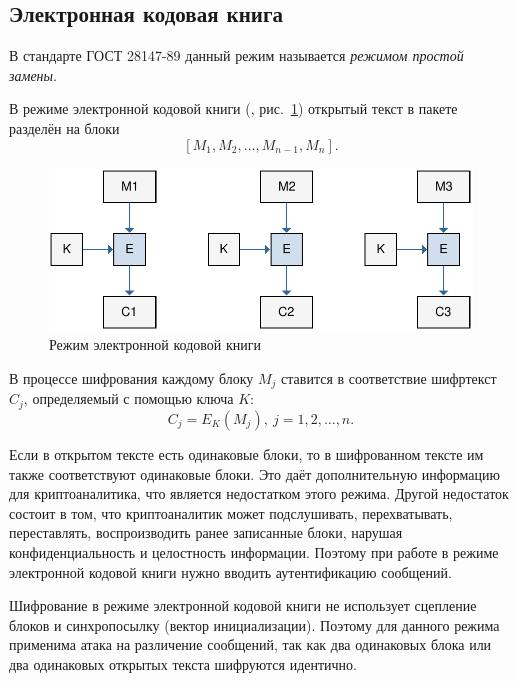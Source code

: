 \subsection{Электронная кодовая книга}

В стандарте ГОСТ 28147-89 данный режим называется \emph{режимом простой замены}.~\cite{GOST-89}

В режиме электронной кодовой книги (, рис.~\ref{fig:ECB}) открытый текст в пакете разделён на блоки
    \[ \left[ M_1, M_2, \dots, M_{n-1}, M_n \right]. \]

\begin{figure}[bt]
	\centering
	\includegraphics[width=1\textwidth]{pic/ECB}
	\caption{Режим электронной кодовой книги}
	\label{fig:ECB}
\end{figure}

В процессе шифрования каждому блоку $M_j$ ставится в соответствие шифртекст $C_j$, определяемый с помощью ключа $K$:
    \[ C_j = E_K(M_j), ~ j = 1, 2, \dots, n. \]

Если в открытом тексте есть одинаковые блоки, то в шифрованном тексте им также соответствуют одинаковые блоки. Это даёт дополнительную информацию для криптоаналитика, что является недостатком этого режима. Другой недостаток состоит в том, что криптоаналитик может подслушивать, перехватывать, переставлять, воспроизводить ранее записанные блоки, нарушая конфиденциальность и целостность информации. Поэтому при работе в режиме электронной кодовой книги нужно вводить аутентификацию сообщений.

Шифрование в режиме электронной кодовой книги не использует сцепление блоков и синхропосылку (вектор инициализации). Поэтому для данного режима применима атака на различение сообщений, так как два одинаковых блока или два одинаковых открытых текста шифруются идентично.

